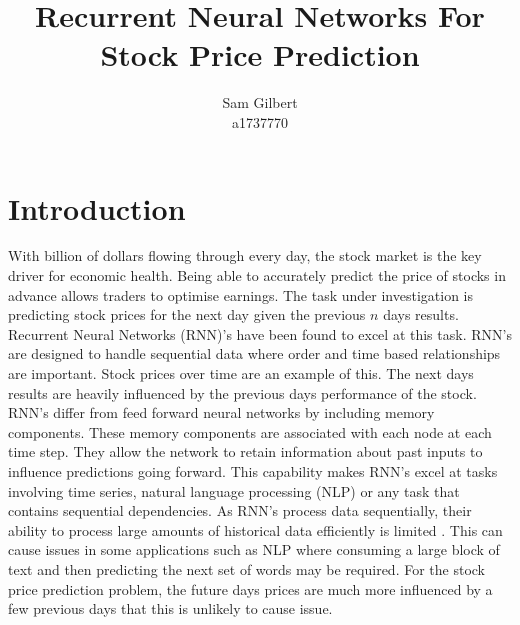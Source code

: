 \documentclass[10pt,twocolumn,letterpaper]{article}
\begin{document}
\title{Recurrent Neural Networks For Stock Price Prediction}

\author{Sam Gilbert\\
   a1737770\\}
\maketitle

\section{Introduction}
With billion of dollars flowing through every day, the stock market is the key driver for
economic health. Being able to accurately predict the price of stocks in advance allows 
traders to optimise earnings. The task under investigation is predicting stock prices 
for the next day given the previous $n$ days results.
 Recurrent Neural Networks (RNN)'s have been found to excel
at this task. RNN's are designed to handle sequential data where order and time based 
relationships are important. Stock prices over time are an example of this.
The next days results are heavily influenced by the previous days performance of the 
stock. RNN's differ from feed forward neural networks by including memory components\cite{amazonWhatRNN}.
These memory components are associated with each node at each time step. They allow the 
network to retain information about past inputs to influence predictions going forward.
This capability makes RNN's excel at tasks involving time series, natural language 
processing (NLP) or any task that contains sequential dependencies. As RNN's process 
data sequentially, their ability to process large amounts of historical data efficiently 
is limited \cite{amazonWhatRNN}. This can cause issues in some applications such as 
NLP where consuming a large block of text and then predicting the next set of words may
be required. For the stock price prediction problem, the future days prices are much 
more influenced by a few previous days that this is unlikely to cause issue. 
\end{document}
